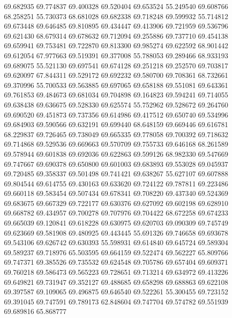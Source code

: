69.682935
69.774837
69.400328
69.520404
69.653524
55.249540
69.608766
68.258251
55.730373
68.681028
69.682338
69.718248
69.599932
55.714812
69.673448
69.646485
69.810895
69.434447
69.413906
69.721959
69.536796
69.621430
68.679314
69.678632
69.712094
69.255886
69.737710
69.454138
69.659941
69.753481
69.722870
69.813300
69.985274
69.622592
68.901442
69.612054
67.977663
69.519391
69.377008
55.788053
69.289466
68.933193
69.689075
55.521130
69.697541
69.674128
69.251218
69.252570
69.703817
69.620097
67.844311
69.529172
69.692232
69.580700
69.708361
68.732661
69.370996
55.700533
69.563885
69.697065
69.658188
69.551081
69.643361
69.761853
69.484673
69.681034
69.704898
69.164823
69.594241
69.714055
69.638438
69.636675
69.528330
69.625574
55.752962
69.528672
69.264760
69.690520
69.451873
69.737356
69.614986
69.417512
69.650740
69.534996
69.684903
69.590566
69.632191
69.699440
68.648159
69.669446
69.616781
68.229837
69.726465
69.738049
69.665335
69.778058
69.700392
69.718632
69.714868
69.529536
69.669663
69.570709
69.755733
69.646168
68.261589
69.578944
69.601838
69.692036
69.622863
69.599126
68.982330
69.547669
69.747667
69.690378
69.650800
69.601003
69.683893
69.553028
69.045937
69.720485
69.358337
69.501498
69.741421
69.638267
55.627107
69.607888
69.804544
69.614755
69.430163
69.633620
69.724122
69.787811
69.223486
69.660118
69.583454
69.507434
69.678341
69.708220
69.437340
69.524369
69.683675
69.667329
69.722177
69.630376
69.627092
69.602198
69.628910
69.668782
69.434957
69.700278
69.707976
69.704422
68.672258
69.674233
69.665039
69.120841
69.618228
69.630975
69.620703
69.090309
69.745749
69.623669
69.581908
69.480925
69.443445
55.691326
69.746658
69.693678
69.543106
69.626742
69.630393
55.598931
69.614840
69.645724
69.589304
69.589237
69.718976
65.503595
69.664159
69.522474
69.562227
65.809766
69.747371
69.385526
69.735532
69.624548
69.705786
69.657404
69.609371
69.760218
69.586473
69.565223
69.728651
69.713214
69.634972
69.413226
69.649821
69.731947
69.352127
69.488685
69.658298
69.688863
69.622108
69.397587
69.109065
69.496875
69.646540
69.522261
55.300455
69.723152
69.391045
69.747591
69.789173
62.848604
69.747704
69.574782
69.551939
69.689816
65.868777
